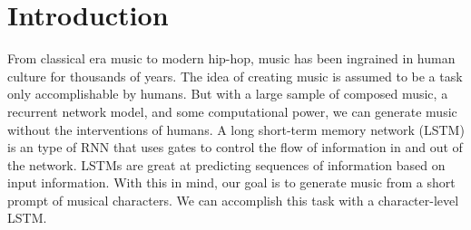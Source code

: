 \section*{Introduction}

From classical era music to modern hip-hop, music has been ingrained in human culture for thousands of years. The idea of creating music is assumed to be a task only accomplishable by humans. But with a large sample of composed music, a recurrent network model, and some computational power, we can generate music without the interventions of humans. A long short-term memory network (LSTM) is an type of RNN that uses gates to control the flow of information in and out of the network. LSTMs are great at predicting sequences of information based on input information. With this in mind, our goal is to generate music from a short prompt of musical characters. We can accomplish this task with a character-level LSTM.